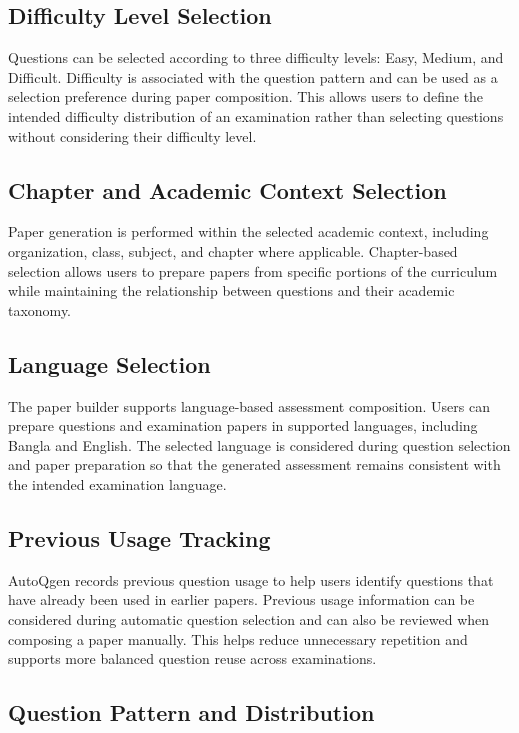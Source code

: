 \subsection{Difficulty Level Selection}

Questions can be selected according to three difficulty levels: Easy, Medium, and Difficult. Difficulty is associated with the question pattern and can be used as a selection preference during paper composition. This allows users to define the intended difficulty distribution of an examination rather than selecting questions without considering their difficulty level.

\subsection{Chapter and Academic Context Selection}

Paper generation is performed within the selected academic context, including organization, class, subject, and chapter where applicable. Chapter-based selection allows users to prepare papers from specific portions of the curriculum while maintaining the relationship between questions and their academic taxonomy.

\subsection{Language Selection}

The paper builder supports language-based assessment composition. Users can prepare questions and examination papers in supported languages, including Bangla and English. The selected language is considered during question selection and paper preparation so that the generated assessment remains consistent with the intended examination language.

\subsection{Previous Usage Tracking}

AutoQgen records previous question usage to help users identify questions that have already been used in earlier papers. Previous usage information can be considered during automatic question selection and can also be reviewed when composing a paper manually. This helps reduce unnecessary repetition and supports more balanced question reuse across examinations.

\subsection{Question Pattern and Distribution}

